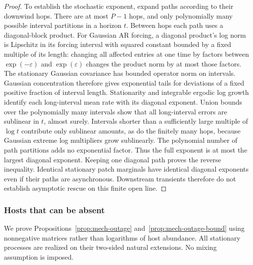 \begin{proof}
To establish the stochastic exponent, expand paths according to their downwind hops. There are at most \(P-1\) hops, and only polynomially many possible interval partitions in a horizon \(t\). Between hops each path uses a diagonal-block product. For Gaussian AR forcing, a diagonal product's log norm is Lipschitz in its forcing interval with squared constant bounded by a fixed multiple of its length: changing all affected entries at one time by factors between \(\exp(-\varepsilon)\) and \(\exp(\varepsilon)\) changes the product norm by at most those factors. The stationary Gaussian covariance has bounded operator norm on intervals. Gaussian concentration therefore gives exponential tails for deviations of a fixed positive fraction of interval length. Stationarity and integrable ergodic log growth identify each long-interval mean rate with its diagonal exponent. Union bounds over the polynomially many intervals show that all long-interval errors are sublinear in \(t\), almost surely. Intervals shorter than a sufficiently large multiple of \(\log t\) contribute only sublinear amounts, as do the finitely many hops, because Gaussian extreme log multipliers grow sublinearly. The polynomial number of path partitions adds no exponential factor. Thus the full exponent is at most the largest diagonal exponent. Keeping one diagonal path proves the reverse inequality. Identical stationary patch marginals have identical diagonal exponents even if their paths are asynchronous. Downstream transients therefore do not establish asymptotic rescue on this finite open line.
\end{proof}

\subsubsection{Hosts that can be absent}\label{app:mech-outage}
We prove Propositions~\ref{prop:mech-outage} and~\ref{prop:mech-outage-bound} using nonnegative matrices rather than logarithms of host abundance. All stationary processes are realized on their two-sided natural extensions. No mixing assumption is imposed.

